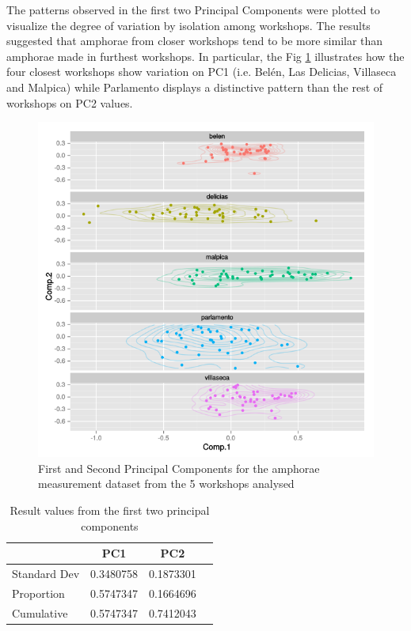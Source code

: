\documentclass[review]{elsarticle}
\begin{document}
The patterns observed in the first two Principal Components were plotted to visualize the degree of variation by isolation among workshops. The results suggested that amphorae from closer workshops tend to be more similar than amphorae made in furthest workshops. In particular, the Fig \ref{pca} illustrates how the four closest workshops show variation on PC1 (i.e. Bel\'en, Las Delicias, Villaseca and Malpica) while Parlamento displays a distinctive pattern than the rest of workshops on PC2 values. 

\begin{figure}[htp]
	\centering
\includegraphics[scale=0.47]{pca.png}
\caption{First and Second Principal Components for the amphorae measurement dataset from the 5 workshops analysed}
\label{pca}
\end{figure} 


\begin{table}[htp]
\begin{tabular}{lccc}
\hline
      		&  PC1 & PC2	 \\ \hline
Standard Dev&0.3480758&0.1873301&\\
Proportion  &0.5747347&0.1664696&\\
Cumulative  &0.5747347&0.7412043& \\

\end{tabular}
\caption{Result values from the first two principal components}
\label{table:spatgeo}
\end{table}
\end{document}
